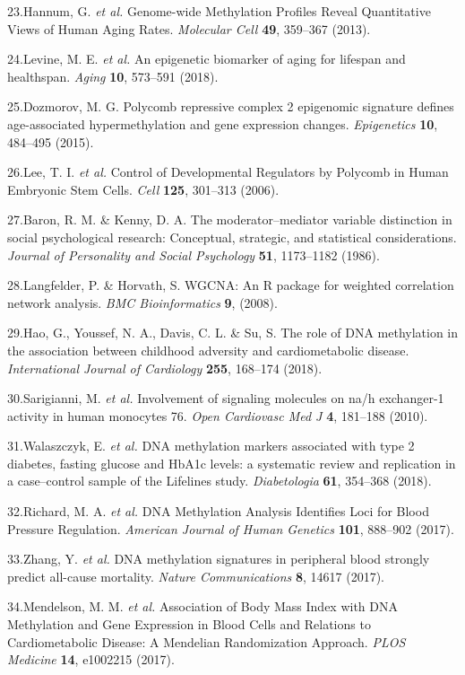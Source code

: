 \documentclass[]{article}
\theoremstyle{definition}
\theoremstyle{definition}
\theoremstyle{definition}
\theoremstyle{remark}
\begin{document}
23.Hannum, G. \emph{et al.} Genome-wide Methylation Profiles Reveal
Quantitative Views of Human Aging Rates. \emph{Molecular Cell}
\textbf{49}, 359--367 (2013).

24.Levine, M. E. \emph{et al.} An epigenetic biomarker of aging for
lifespan and healthspan. \emph{Aging} \textbf{10}, 573--591 (2018).

25.Dozmorov, M. G. Polycomb repressive complex 2 epigenomic signature
defines age-associated hypermethylation and gene expression changes.
\emph{Epigenetics} \textbf{10}, 484--495 (2015).

26.Lee, T. I. \emph{et al.} Control of Developmental Regulators by
Polycomb in Human Embryonic Stem Cells. \emph{Cell} \textbf{125},
301--313 (2006).

27.Baron, R. M. \& Kenny, D. A. The moderator--mediator variable
distinction in social psychological research: Conceptual, strategic, and
statistical considerations. \emph{Journal of Personality and Social
Psychology} \textbf{51}, 1173--1182 (1986).

28.Langfelder, P. \& Horvath, S. WGCNA: An R package for weighted
correlation network analysis. \emph{BMC Bioinformatics} \textbf{9},
(2008).

29.Hao, G., Youssef, N. A., Davis, C. L. \& Su, S. The role of DNA
methylation in the association between childhood adversity and
cardiometabolic disease. \emph{International Journal of Cardiology}
\textbf{255}, 168--174 (2018).

30.Sarigianni, M. \emph{et al.} Involvement of signaling molecules on
na/h exchanger-1 activity in human monocytes 76. \emph{Open Cardiovasc
Med J} \textbf{4}, 181--188 (2010).

31.Walaszczyk, E. \emph{et al.} DNA methylation markers associated with
type 2 diabetes, fasting glucose and HbA1c levels: a systematic review
and replication in a case--control sample of the Lifelines study.
\emph{Diabetologia} \textbf{61}, 354--368 (2018).

32.Richard, M. A. \emph{et al.} DNA Methylation Analysis Identifies Loci
for Blood Pressure Regulation. \emph{American Journal of Human Genetics}
\textbf{101}, 888--902 (2017).

33.Zhang, Y. \emph{et al.} DNA methylation signatures in peripheral
blood strongly predict all-cause mortality. \emph{Nature Communications}
\textbf{8}, 14617 (2017).

34.Mendelson, M. M. \emph{et al.} Association of Body Mass Index with
DNA Methylation and Gene Expression in Blood Cells and Relations to
Cardiometabolic Disease: A Mendelian Randomization Approach. \emph{PLOS
Medicine} \textbf{14}, e1002215 (2017).
\end{document}
